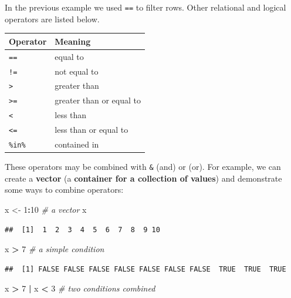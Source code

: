 \documentclass[
]{book}
\newenvironment{Shaded}{\begin{snugshade}}{\end{snugshade}}
\newcommand{\CommentTok}[1]{\textcolor[rgb]{0.56,0.35,0.01}{\textit{#1}}}
\newcommand{\DecValTok}[1]{\textcolor[rgb]{0.00,0.00,0.81}{#1}}
\newcommand{\NormalTok}[1]{#1}
\newcommand{\OperatorTok}[1]{\textcolor[rgb]{0.81,0.36,0.00}{\textbf{#1}}}
\newcommand{\StringTok}[1]{\textcolor[rgb]{0.31,0.60,0.02}{#1}}
\begin{document}
In the previous example we used \texttt{==} to filter rows. Other relational
and logical operators are listed below.

\begin{longtable}[]{@{}ll@{}}
\toprule
Operator & Meaning\tabularnewline
\midrule
\endhead
\texttt{==} & equal to\tabularnewline
\texttt{!=} & not equal to\tabularnewline
\texttt{\textgreater{}} & greater than\tabularnewline
\texttt{\textgreater{}=} & greater than or equal to\tabularnewline
\texttt{\textless{}} & less than\tabularnewline
\texttt{\textless{}=} & less than or equal to\tabularnewline
\texttt{\%in\%} & contained in\tabularnewline
\bottomrule
\end{longtable}

These operators may be combined with \texttt{\&} (and) or \texttt{\textbar{}} (or). For example,
we can create a \textbf{vector} (a \textbf{container for a collection of values}) and demonstrate
some ways to combine operators:

\begin{Shaded}
\begin{Highlighting}[]
\NormalTok{x <-}\StringTok{ }\DecValTok{1}\OperatorTok{:}\DecValTok{10} \CommentTok{# a vector}
\NormalTok{x}
\end{Highlighting}
\end{Shaded}

\begin{verbatim}
##  [1]  1  2  3  4  5  6  7  8  9 10
\end{verbatim}

\begin{Shaded}
\begin{Highlighting}[]
\NormalTok{x }\OperatorTok{>}\StringTok{ }\DecValTok{7} \CommentTok{# a simple condition}
\end{Highlighting}
\end{Shaded}

\begin{verbatim}
##  [1] FALSE FALSE FALSE FALSE FALSE FALSE FALSE  TRUE  TRUE  TRUE
\end{verbatim}

\begin{Shaded}
\begin{Highlighting}[]
\NormalTok{x }\OperatorTok{>}\StringTok{ }\DecValTok{7} \OperatorTok{|}\StringTok{ }\NormalTok{x }\OperatorTok{<}\StringTok{ }\DecValTok{3} \CommentTok{# two conditions combined}
\end{Highlighting}
\end{Shaded}
\end{document}
